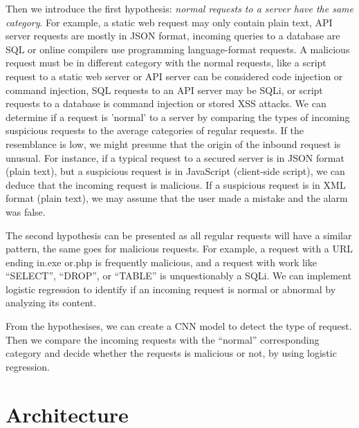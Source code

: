 Then we introduce the first hypothesis: \textit{normal requests to a server have the same category}. For example, a static web request may only contain plain text, API server requests are mostly in JSON format, incoming queries to a database are SQL or online compilers use programming language-format requests. A malicious request must be in different category with the normal requests, like a script request to a static web server or API server can be considered code injection or command injection, SQL requests to an API server may be SQLi, or script requests to a database is command injection or stored XSS attacks. We can determine if a request is 'normal' to a server by comparing the types of incoming suspicious requests to the average categories of regular requests. If the resemblance is low, we might presume that the origin of the inbound request is unusual. For instance, if a typical request to a secured server is in JSON format (plain text), but a suspicious request is in JavaScript (client-side script), we can deduce that the incoming request is malicious. If a suspicious request is in XML format (plain text), we may assume that the user made a mistake and the alarm was false.



The second hypothesis can be presented as all regular requests will have a similar pattern, the same goes for malicious requests. For example, a request with a URL ending in.exe or.php is frequently malicious, and a request with work like ``SELECT'', ``DROP'', or ``TABLE'' is unquestionably a SQLi. We can implement logistic regression to identify if an incoming request is normal or abnormal by analyzing its content.

From the hypothesises, we can create a CNN model to detect the type of request. Then we compare the incoming requests with the ``normal'' corresponding category and decide whether the requests is malicious or not, by using logistic regression.


\section{Architecture}
\label{architecture design}

